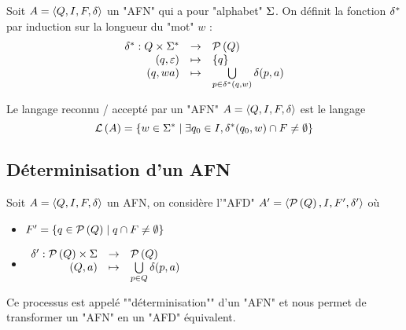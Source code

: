 \begin{definition}
	Soit $A = \langle Q, I, F, \delta \rangle$ un "AFN" qui a pour "alphabet" $\Sigma$. On définit la fonction $\delta^{*}$ par induction sur la longueur du "mot" $w$ :
	$$ \begin{array}{rcl}
			\delta^{*} : Q \times \Sigma^{*} & \to     & \mathcal{P}\left(Q\right)                                                  \\
			(q, \varepsilon)                   & \mapsto & \left\{q\right\}                                                    \\
			(q, wa)                         & \mapsto & \bigcup\limits_{p \in \delta^{*} (q, w)} \delta(p, a)
		\end{array} $$
\end{definition}


\begin{definition}
	Le langage reconnu / accepté par un "AFN" $A = \langle Q, I, F, \delta \rangle$ est le langage
	$$ \mathcal{L}\left(A\right) = \left\{w \in \Sigma^{*} \mid \exists q_0 \in I, \delta^{*}(q_0, w) \cap F \neq \emptyset\right\} $$

\end{definition}

\subsection{Déterminisation d'un AFN}
Soit $A = \langle Q, I, F, \delta \rangle$ un AFN, on considère l'"AFD" $A' = \langle \mathcal{P}\left(Q\right), I, F', \delta' \rangle$ où
\begin{itemize}
	\item $F' = \left\{q \in \mathcal{P}\left(Q\right) \mid q \cap F \neq \emptyset\right\}$
	      \vspace{0.25cm}
	\item $ \begin{array}{rcl}
			      \delta' : \mathcal{P}\left(Q\right) \times \Sigma & \to     & \mathcal{P}\left(Q\right)                              \\
			      (Q, a)                              & \mapsto & \bigcup\limits_{p \in Q} \delta(p, a)
		      \end{array} $
\end{itemize}

\vspace{0.25cm}

\AP
Ce processus est appelé ""déterminisation"" d'un "AFN" et nous permet de transformer un "AFN" en un "AFD" équivalent.

